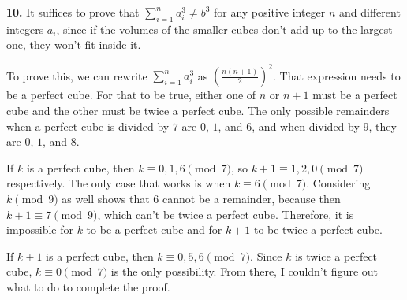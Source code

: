 \documentclass{article}
\begin{document}
\textbf{10.} It suffices to prove that $\sum_{i = 1}^n a_i^3 \neq b^3$ for any positive integer $n$ and different integers $a_i$, since if the volumes of the smaller cubes don't add up to the largest one, they won't fit inside it.
\newline

To prove this, we can rewrite $\sum_{i = 1}^n a_i^3$ as $\left(\frac{n(n + 1)}{2}\right)^2$. That expression needs to be a perfect cube. For that to be true, either one of $n$ or $n + 1$ must be a perfect cube and the other must be twice a perfect cube. The only possible remainders when a perfect cube is divided by $7$ are $0$, $1$, and $6$, and when divided by $9$, they are $0$, $1$, and $8$.
\newline

If $k$ is a perfect cube, then $k \equiv 0, 1, 6 \pmod{7}$, so $k + 1 \equiv 1, 2, 0 \pmod{7}$ respectively. The only case that works is when $k \equiv 6 \pmod{7}$. Considering $k \pmod{9}$ as well shows that $6$ cannot be a remainder, because then $k + 1 \equiv 7 \pmod{9}$, which can't be twice a perfect cube. Therefore, it is impossible for $k$ to be a perfect cube and for $k + 1$ to be twice a perfect cube.
\newline

If $k + 1$ is a perfect cube, then $k \equiv 0, 5, 6 \pmod{7}$. Since $k$ is twice a perfect cube, $k \equiv 0 \pmod{7}$ is the only possibility. From there, I couldn't figure out what to do to complete the proof.
\end{document}
